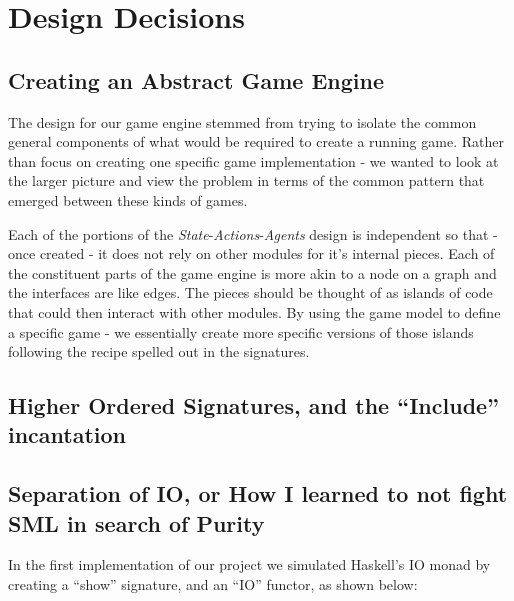 \documentclass[9pt,letterpaper]{extarticle}
\begin{document}
	\section{Design Decisions}

  \subsection{Creating an Abstract Game Engine}
  The design for our game engine stemmed from trying to isolate the common
  general components of what would be required to create a running game.
  Rather than focus on creating one specific game implementation - we wanted to
  look at the larger picture and view the problem in terms of the common pattern
  that emerged between these kinds of games.
  
  Each of the portions of the \textit{State}-\textit{Actions}-\textit{Agents}
  design is independent so that - once created - it does not rely on other
  modules for it's internal pieces.
  Each of the constituent parts of the game engine is more akin to a node on a
  graph and the interfaces are like edges.
  The pieces should be thought of as islands of code that could then interact
  with other modules. By using the game model to define a specific game - we
  essentially create more specific versions of those islands following the
  recipe spelled out in the signatures.

  \subsection{Higher Ordered Signatures, and the ``Include'' incantation}
  \subsection{Separation of IO, or How I learned to not fight SML in search of Purity}
  In the first implementation of our project we simulated Haskell's IO monad by
  creating a ``show'' signature, and an ``IO'' functor, as shown below:
\end{document}
